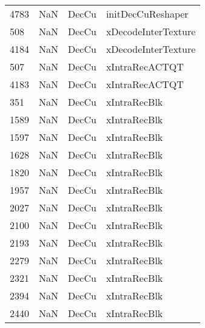 \begin{tabular}{llll}
4783 &                   NaN &                      DecCu &                         initDecCuReshaper \\
508  &                   NaN &                      DecCu &                       xDecodeInterTexture \\
4184 &                   NaN &                      DecCu &                       xDecodeInterTexture \\
507  &                   NaN &                      DecCu &                            xIntraRecACTQT \\
4183 &                   NaN &                      DecCu &                            xIntraRecACTQT \\
351  &                   NaN &                      DecCu &                              xIntraRecBlk \\
1589 &                   NaN &                      DecCu &                              xIntraRecBlk \\
1597 &                   NaN &                      DecCu &                              xIntraRecBlk \\
1628 &                   NaN &                      DecCu &                              xIntraRecBlk \\
1820 &                   NaN &                      DecCu &                              xIntraRecBlk \\
1957 &                   NaN &                      DecCu &                              xIntraRecBlk \\
2027 &                   NaN &                      DecCu &                              xIntraRecBlk \\
2100 &                   NaN &                      DecCu &                              xIntraRecBlk \\
2193 &                   NaN &                      DecCu &                              xIntraRecBlk \\
2279 &                   NaN &                      DecCu &                              xIntraRecBlk \\
2321 &                   NaN &                      DecCu &                              xIntraRecBlk \\
2394 &                   NaN &                      DecCu &                              xIntraRecBlk \\
2440 &                   NaN &                      DecCu &                              xIntraRecBlk \\

\end{tabular}
